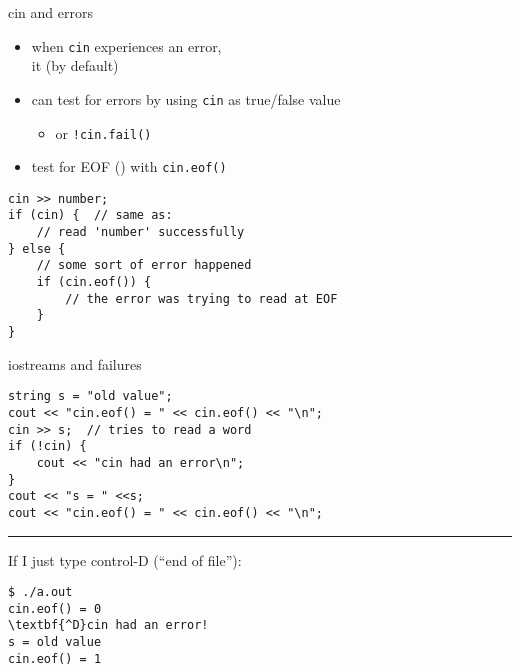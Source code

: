 \begin{frame}[fragile,label=EOFAndIoStreamsA]{cin and errors}
    \lstset{language=C++,style=small}
    \begin{itemize}
    \item when \texttt{cin} experiences an error, \\ it  (by default)
    \item can test for errors by using \texttt{cin} as true/false value
        \begin{itemize}
        \item or \lstinline|!cin.fail()|
        \end{itemize}
    \item test for EOF () with \lstinline|cin.eof()|
    \end{itemize}
\begin{lstlisting}
cin >> number;
if (cin) {  // same as:
    // read 'number' successfully
} else {
    // some sort of error happened
    if (cin.eof()) {
        // the error was trying to read at EOF
    }
}
\end{lstlisting}
\end{frame}

\begin{frame}[fragile,label=EOFAndIoStreamsB]{iostreams and failures}
    \lstset{language=C++,style=small}
\begin{lstlisting}
string s = "old value";
cout << "cin.eof() = " << cin.eof() << "\n";
cin >> s;  // tries to read a word
if (!cin) {
    cout << "cin had an error\n";
}
cout << "s = " <<s;
cout << "cin.eof() = " << cin.eof() << "\n";
\end{lstlisting}
\hrule
If I just type control-D (``end of file''):
\begin{Verbatim}[commandchars=\\\{\},fontsize=\small]
$ ./a.out 
cin.eof() = 0
\textbf{^D}cin had an error!
s = old value
cin.eof() = 1
\end{Verbatim}
\end{frame}
